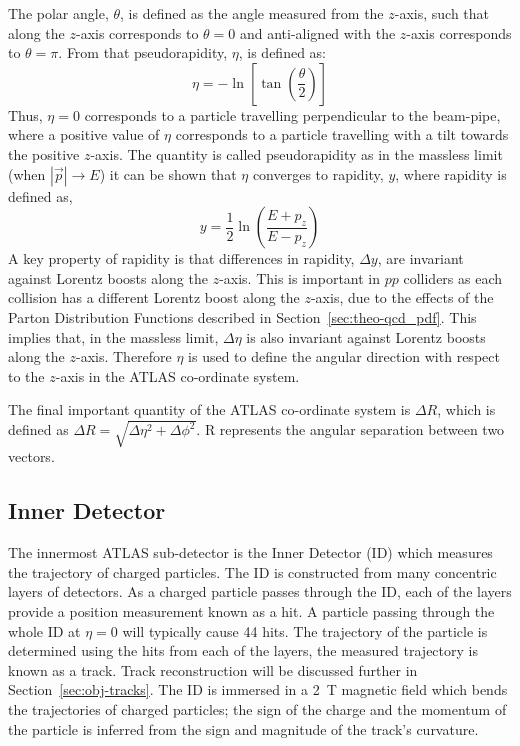 The polar angle, $\theta$, is defined as the angle measured from the $z$-axis,
such that along the $z$-axis corresponds to $\theta = 0$
and anti-aligned with the $z$-axis corresponds to $\theta = \pi$.
From that pseudorapidity, $\eta$, is defined as:
\begin{equation}
 \eta = -\ln\left[\tan\left( \frac{\theta}{2} \right) \right]
\end{equation}
Thus, $\eta = 0$ corresponds to a particle travelling perpendicular to the beam-pipe,
where a positive value of $\eta$ corresponds to a particle travelling with a tilt towards the positive $z$-axis.
The quantity is called pseudorapidity as in the massless limit (when $|\vec{p}| \to E$)
it can be shown that $\eta$ converges to rapidity, $y$, where rapidity is defined as,
\begin{equation}
  y = \frac{1}{2} \ln \left( \frac{E+p_{z}}{E-p_{z}} \right)
\end{equation}
A key property of rapidity is that differences in rapidity, $\Delta y$, are invariant against Lorentz boosts along the $z$-axis.
This is important in $pp$ colliders as each collision has  a different Lorentz boost along the $z$-axis,
due to the effects of the Parton Distribution Functions described in Section~\ref{sec:theo-qcd_pdf}.
This implies that, in the massless limit, $\Delta \eta$ is also invariant against Lorentz boosts along the $z$-axis.
Therefore $\eta$ is used to define the angular direction with respect to the $z$-axis in the ATLAS co-ordinate system.

The final important quantity of the ATLAS co-ordinate system is $\Delta R$, which is defined as $\Delta R = \sqrt{\Delta\eta^{2} + \Delta\phi^{2}}$.  
\Delta R represents the angular separation between two vectors.



\subsection{Inner Detector}
\label{sec:det-ID}

The innermost ATLAS sub-detector is the Inner Detector (ID) which
measures the trajectory of charged particles.
The ID is constructed from many concentric layers of detectors.
As a charged particle passes through the ID, each of the layers provide a position measurement known as a hit.
A particle passing through the whole ID at $\eta=0$ will typically cause 44 hits. %
The trajectory of the particle is determined using the hits from each of the layers,
the measured trajectory is known as a track. Track reconstruction will be discussed further in Section~\ref{sec:obj-tracks}.
The ID is immersed in a 2~T magnetic field which bends the trajectories of charged particles;
the sign of the charge and the momentum of the particle is inferred from the sign and magnitude of the track's curvature.

